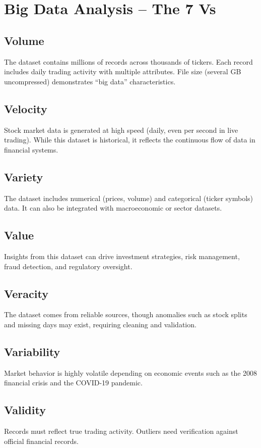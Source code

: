 \documentclass[conference]{IEEEtran}
\begin{document}
\section{Big Data Analysis – The 7 Vs}
\subsection{Volume}
The dataset contains millions of records across thousands of tickers. Each record includes daily trading activity with multiple attributes. File size (several GB uncompressed) demonstrates ``big data'' characteristics.

\subsection{Velocity}
Stock market data is generated at high speed (daily, even per second in live trading). While this dataset is historical, it reflects the continuous flow of data in financial systems.

\subsection{Variety}
The dataset includes numerical (prices, volume) and categorical (ticker symbols) data. It can also be integrated with macroeconomic or sector datasets.

\subsection{Value}
Insights from this dataset can drive investment strategies, risk management, fraud detection, and regulatory oversight.

\subsection{Veracity}
The dataset comes from reliable sources, though anomalies such as stock splits and missing days may exist, requiring cleaning and validation.

\subsection{Variability}
Market behavior is highly volatile depending on economic events such as the 2008 financial crisis and the COVID-19 pandemic.

\subsection{Validity}
Records must reflect true trading activity. Outliers need verification against official financial records.
\end{document}
